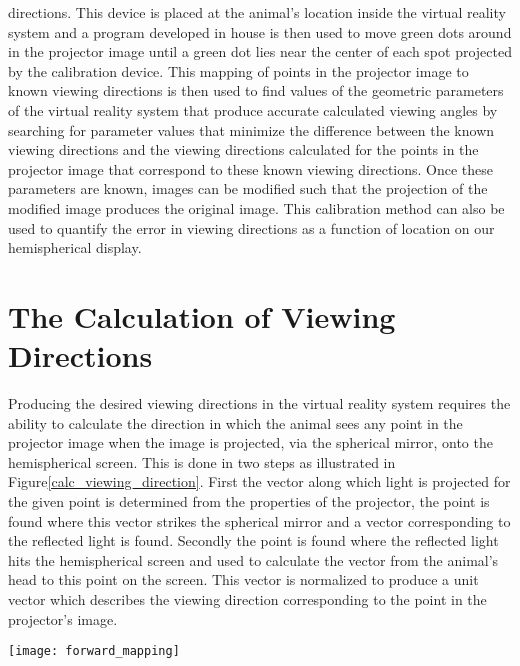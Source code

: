 \documentclass{article}
\begin{document}
directions. This device is placed at the animal's location inside the virtual
reality system and a program developed in house is then used to move green dots
around in the projector image until a green dot lies near the center of each
spot projected by the calibration device. This mapping of points in the
projector image to known viewing directions is then used to find values of the
geometric parameters of the virtual reality system that produce accurate
calculated viewing angles by searching for parameter values that minimize the
difference between the known viewing directions and the viewing directions
calculated for the points in the projector image that correspond to these known
viewing directions. Once these parameters are known, images can be modified
such that the projection of the modified image produces the original image.
This calibration method can also be used to quantify the error in viewing
directions as a function of location on our hemispherical display.  


\section{The Calculation of Viewing Directions}

Producing the desired viewing directions in the virtual reality system requires 
the ability to calculate the direction in which the animal sees any point in
the projector image when the image is projected, via the spherical mirror, onto
the hemispherical screen.  This is done in two steps as illustrated in
Figure\ref{calc_viewing_direction}. First the vector along which light is
projected for the given point is determined from the properties of the
projector, the point is found where this vector strikes the spherical mirror
and a vector corresponding to the reflected light is found. Secondly the point
is found where the reflected light hits the hemispherical screen and used to
calculate the vector from the animal's head to this point on the screen. This
vector is normalized to produce a unit vector which describes the viewing
direction corresponding to the point in the projector's image.

\texttt{[image: forward\_mapping]}
\end{document}
